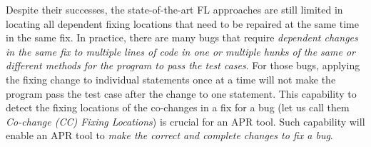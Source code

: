 
Despite their successes, the state-of-the-art FL approaches are still
limited in locating all dependent fixing locations that need to be
repaired at the same time in the same fix. In practice, there are
many bugs that require {\em dependent changes in the same fix to
  multiple lines of code in one or multiple hunks of the same or
  different methods for the program to pass the test cases}.
For those bugs, applying the fixing change to individual statements
once at a time will not make the program pass the test case after the
change to one statement.
%
This capability to detect the fixing locations of the co-changes in a
fix for a bug (let us call them {\em Co-change (CC) Fixing Locations})
is crucial for an APR tool.
%
Such capability will enable an APR tool to {\em make the
  correct and complete changes to fix a bug}.


